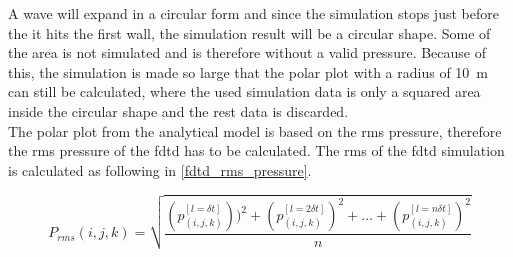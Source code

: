 A wave will expand in a circular form and since the simulation stops just before the it hits the first wall, the simulation result will be a circular shape. Some of the area is not simulated and is therefore without a valid pressure. Because of this, the simulation is made so large that the polar plot with a radius of \SI{10}{\meter} can still be calculated, where the used simulation data is only a squared area inside the circular shape and the rest data is discarded.\\

The polar plot from the analytical model is based on the \gls{rms} pressure, therefore the \gls{rms} pressure of the \gls{fdtd} has to be calculated. The \gls{rms} of the \gls{fdtd} simulation is calculated as following in \autoref{fdtd_rms_pressure}.

\begin{equation}\label{fdtd_rms_pressure}
P_{rms}(i,j,k)=\sqrt{\frac{\left(p_{(i,j,k)}^{[l= \delta t]} \right))^2 + \left(p_{(i,j,k)}^{[l= 2\delta t]}\right)^2 +...+\left(p_{(i,j,k)}^{[l= n\delta t]}\right)^2}{n}}
\end{equation}



